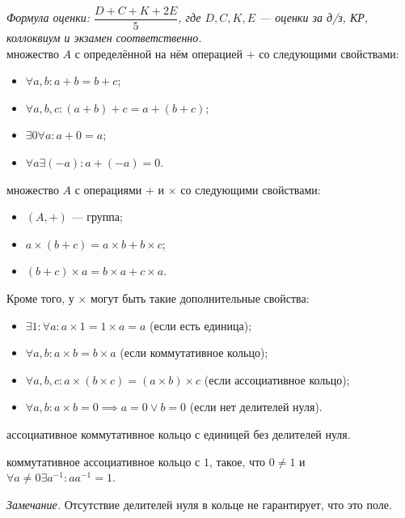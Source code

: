 \documentclass[12pt,a4paper]{article}
\begin{document}

\textit{Формула оценки: $\dfrac{D+C+K+2E}{5}$, где $D,C,K,E$ --- оценки за д/з, КР, коллоквиум и экзамен соответственно.}\\

 множество $A$ с определённой на нём операцией $+$ со следующими свойствами:

\begin{itemize}
	\item $\forall a,b:a+b=b+c$;
	\item $\forall a,b,c:(a+b)+c=a+(b+c)$;
	\item $\exists 0\forall a:a+0=a$;
	\item $\forall a\exists (-a):a+(-a)=0$.
\end{itemize}

 множество $A$ с операциями $+$ и $\times $ со следующими свойствами:

\begin{itemize}
	\item $(A,+)$ --- группа;
	\item $a\times (b+c)=a\times b+b\times c$;
	\item $(b+c)\times a=b\times a+c\times a$.
\end{itemize}

Кроме того, у $\times $ могут быть такие дополнительные свойства:

\begin{itemize}
	\item $\exists 1:\forall a:a\times 1=1\times a=a$ (если есть единица);
	\item $\forall a,b:a\times b=b\times a$ (если коммутативное кольцо);
	\item $\forall a,b,c:a\times (b\times c)=(a\times b)\times c$ (если ассоциативное кольцо);
	\item $\forall a,b:a\times b=0\implies a=0\lor b=0$ (если нет делителей нуля).
\end{itemize}

 ассоциативное коммутативное кольцо с единицей без делителей нуля.

 коммутативное ассоциативное кольцо с $1$, такое, что $0\neq 1$ и $\forall a\neq 0\exists a^{-1}:aa^{-1}=1$.

\textit{Замечание.} Отсутствие делителей нуля в кольце не гарантирует, что это поле.
\end{document}

